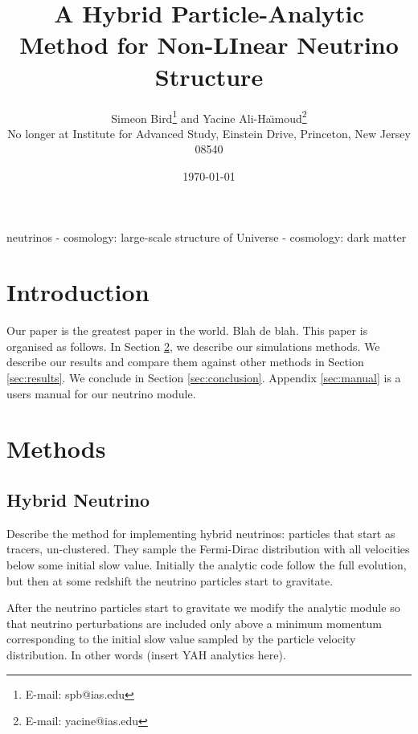 \documentclass[useAMS, usenatbib]{mnras}
\title{A Hybrid Particle-Analytic Method for Non-LInear Neutrino Structure}
\author[ S. Bird and Y. Ali-Ha\"{\i}moud]{
  Simeon Bird\thanks{E-mail: spb@ias.edu} and Yacine Ali-Ha\"{\i}moud\thanks{E-mail: yacine@ias.edu}\vspace{1.5mm}\\
No longer at Institute for Advanced Study, Einstein Drive, Princeton, New Jersey 08540}
\begin{document}
\date{\today}

\pagerange{\pageref{firstpage}--\pageref{lastpage}} 
\label{firstpage}

\maketitle

\begin{abstract}
\end{abstract}

\begin{keywords}
        neutrinos - cosmology: large-scale structure of Universe - cosmology: dark matter
\end{keywords}

\section{Introduction}

Our paper is the greatest paper in the world. Blah de blah.
This paper is organised as follows. In Section \ref{sec:methods},
we describe our simulations methods. We describe our
results and compare them against other methods
in Section \ref{sec:results}. We conclude in Section \ref{sec:conclusion}.
Appendix \ref{sec:manual} is a users manual for our neutrino module.
\cite{AHB}

\section{Methods}
\label{sec:methods}


\subsection{Hybrid Neutrino}
\label{sec:hybrid}

Describe the method for implementing hybrid neutrinos:
particles that start as tracers, un-clustered. They sample
the Fermi-Dirac distribution with all velocities below some
initial slow value. Initially the analytic code follow the full evolution,
but then at some redshift the neutrino particles start to gravitate.

After the neutrino particles start to gravitate we modify the
analytic module so that neutrino perturbations are included only above a
minimum momentum corresponding to the initial slow value sampled by the
particle velocity distribution. In other words (insert YAH analytics here).
\end{document}
